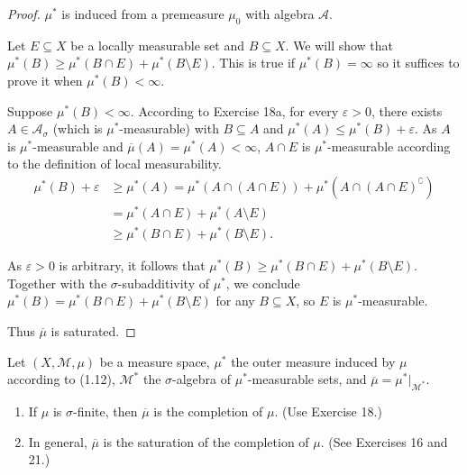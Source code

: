 \begin{proof}
    \( \mu^{\ast} \) is induced from a premeasure \( \mu_{0} \) with algebra \( \mathcal{A} \).

    Let \( E \subseteq X \) be a locally measurable set and \( B \subseteq X \). We will show that \( \mu^{\ast}(B) \ge \mu^{\ast}(B \cap E) + \mu^{\ast}(B \setminus E) \). This is true if \( \mu^{\ast}(B) = \infty \) so it suffices to prove it when \( \mu^{\ast}(B) < \infty \).

    Suppose \( \mu^{\ast}(B) < \infty \). According to Exercise 18a, for every \( \varepsilon > 0 \), there exists \( A \in \mathcal{A}_{\sigma} \) (which is \(\mu^{\ast}\)-measurable) with \( B \subseteq A \) and \( \mu^{\ast}(A) \le \mu^{\ast}(B) + \varepsilon \). As \( A \) is \( \mu^{\ast} \)-measurable and \( \overline{\mu}(A) = \mu^{\ast}(A) < \infty \), \( A \cap E \) is \( \mu^{\ast} \)-measurable according to the definition of local measurability.
    \begingroup
    \allowdisplaybreaks%
    \begin{align*}
        \mu^{\ast}(B) + \varepsilon & \ge \mu^{\ast}(A) = \mu^{\ast}(A \cap (A \cap E)) + \mu^{\ast}(A \cap {(A \cap E)}^{\complement}) \\
                                    & = \mu^{\ast}(A \cap E) + \mu^{\ast}(A \setminus E)                                                \\
                                    & \ge \mu^{\ast}(B \cap E) + \mu^{\ast}(B \setminus E).
    \end{align*}
    \endgroup

    As \( \varepsilon > 0 \) is arbitrary, it follows that \( \mu^{\ast}(B) \ge \mu^{\ast}(B \cap E) + \mu^{\ast}(B \setminus E) \). Together with the \(\sigma\)-subadditivity of \( \mu^{\ast} \), we conclude \( \mu^{\ast}(B) = \mu^{\ast}(B \cap E) + \mu^{\ast}(B \setminus E) \) for any \( B \subseteq X \), so \( E \) is \( \mu^{\ast} \)-measurable.

    Thus \( \overline{\mu} \) is saturated.
\end{proof}

\newpage

\begin{exercise}
    Let \( (X, \mathcal{M}, \mu) \) be a measure space, \( \mu^{\ast} \) the outer measure induced by \( \mu \) according to (1.12), \( \mathcal{M}^{\ast} \) the \( \sigma \)-algebra of \( \mu^{\ast} \)-measurable sets, and \( \overline{\mu} = \mu^{\ast}\vert_{\mathcal{M}^{\ast}} \).
    \begin{enumerate}[itemsep=0pt,label=\textbf{\alph*.}]
        \item If \( \mu \) is \( \sigma \)-finite, then \( \overline{\mu} \) is the completion of \( \mu \). (Use Exercise 18.)
        \item In general, \( \overline{\mu} \) is the saturation of the completion of \( \mu \). (See Exercises 16 and 21.)
    \end{enumerate}
\end{exercise}

